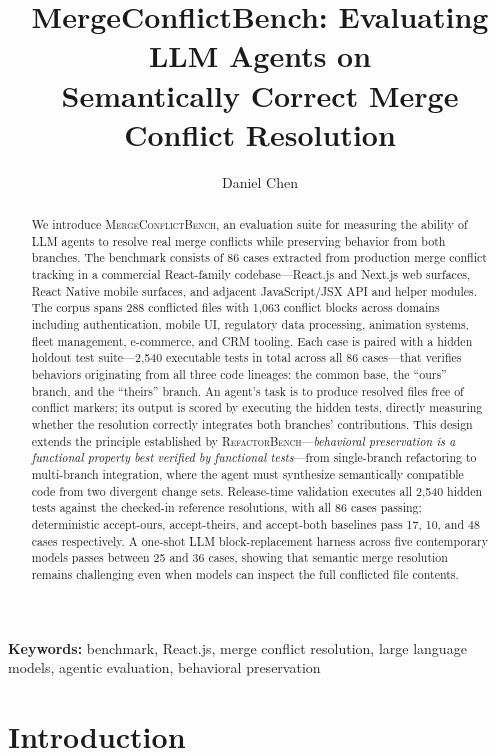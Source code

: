 \documentclass[11pt,letterpaper]{article}
\title{\textbf{MergeConflictBench: Evaluating LLM Agents on\\Semantically Correct Merge Conflict Resolution}}
\author[1]{Daniel Chen}
\affil[1]{Anything, Inc.}
\date{}
\begin{document}
\maketitle

\begin{abstract}
We introduce \textsc{MergeConflictBench}, an evaluation suite for measuring the ability of LLM agents to resolve real merge conflicts while preserving behavior from both branches. The benchmark consists of 86 cases extracted from production merge conflict tracking in a commercial React-family codebase---React.js and Next.js web surfaces, React Native mobile surfaces, and adjacent JavaScript/JSX API and helper modules. The corpus spans 288 conflicted files with 1{,}063 conflict blocks across domains including authentication, mobile UI, regulatory data processing, animation systems, fleet management, e-commerce, and CRM tooling. Each case is paired with a hidden holdout test suite---2{,}540 executable tests in total across all 86 cases---that verifies behaviors originating from all three code lineages: the common base, the ``ours'' branch, and the ``theirs'' branch. An agent's task is to produce resolved files free of conflict markers; its output is scored by executing the hidden tests, directly measuring whether the resolution correctly integrates both branches' contributions. This design extends the principle established by \textsc{RefactorBench}---\emph{behavioral preservation is a functional property best verified by functional tests}---from single-branch refactoring to multi-branch integration, where the agent must synthesize semantically compatible code from two divergent change sets. Release-time validation executes all 2{,}540 hidden tests against the checked-in reference resolutions, with all 86 cases passing; deterministic accept-ours, accept-theirs, and accept-both baselines pass 17, 10, and 48 cases respectively. A one-shot LLM block-replacement harness across five contemporary models passes between 25 and 36 cases, showing that semantic merge resolution remains challenging even when models can inspect the full conflicted file contents.
\end{abstract}

\medskip
\noindent\textbf{Keywords:} benchmark, React.js, merge conflict resolution, large language models, agentic evaluation, behavioral preservation

\section{Introduction}
\label{sec:introduction}
\end{document}
